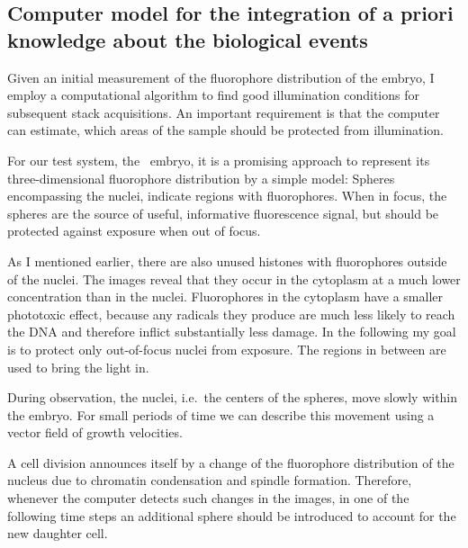 \subsection{Computer model for the integration of a priori knowledge
about the biological events} 
Given an initial measurement of the fluorophore distribution of the
embryo, I employ a computational algorithm to find good illumination
conditions for subsequent stack acquisitions. An important requirement
is that the computer can estimate, which areas of the sample should be
protected from illumination.

For our test system, the \celegans\ embryo, it is a promising approach
to represent its three-dimensional fluorophore distribution by a
simple model: Spheres encompassing the nuclei, indicate regions with
fluorophores. When in focus, the spheres are the source of useful,
informative fluorescence signal, but should be protected against
exposure when out of focus.

As I mentioned earlier, there are also unused histones with
fluorophores outside of the nuclei. The images reveal that they occur
in the cytoplasm at a much lower concentration than in the
nuclei. Fluorophores in the cytoplasm have a smaller phototoxic
effect, because any radicals they produce are much less likely to
reach the DNA and therefore inflict substantially less damage.  In the
following my goal is to protect only out-of-focus nuclei from
exposure. The regions in between are used to bring the light in.


During observation, the nuclei, i.e.\ the centers of the spheres, move
slowly within the embryo. For small periods of time we can describe
this movement using a vector field of growth velocities.

A cell division announces itself by a change of the fluorophore
distribution of the nucleus due to chromatin condensation and spindle
formation. Therefore, whenever the computer detects such changes in
the images, in one of the following time steps an additional sphere
should be introduced to account for the new daughter cell.

